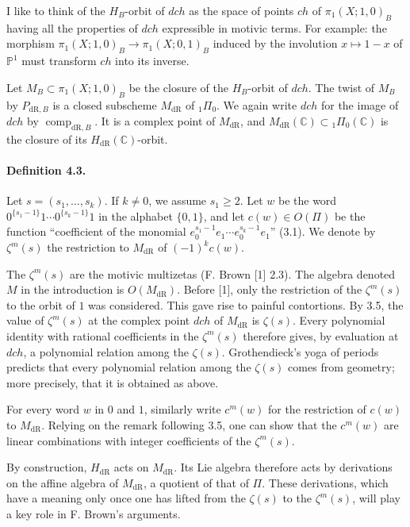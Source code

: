 \documentclass[11pt]{article}
\newcommand{\C}{\mathbb C}
\newcommand{\PP}{\mathbb P}
\newcommand{\comp}{\operatorname{comp}}
\newcommand{\dR}{\mathrm{dR}}
\begin{document}
I like to think of the $H_B$-orbit of $dch$ as the space of points $ch$ of $\pi_1(X;1,0)_B$ having all the properties of $dch$ expressible in motivic terms.
For example: the morphism $\pi_1(X;1,0)_B\to\pi_1(X;0,1)_B$ induced by the involution $x\mapsto1-x$ of $\PP^1$ must transform $ch$ into its inverse.

Let $M_B\subset\pi_1(X;1,0)_B$ be the closure of the $H_B$-orbit of $dch$.
The twist of $M_B$ by $P_{\dR,B}$ is a closed subscheme $M_{\dR}$ of ${}_1\Pi_0$.
We again write $dch$ for the image of $dch$ by $\comp_{\dR,B}$.
It is a complex point of $M_{\dR}$, and $M_{\dR}(\C)\subset{}_1\Pi_0(\C)$ is the closure of its $H_{\dR}(\C)$-orbit.

\paragraph{Definition 4.3.}
Let $s=(s_1,\ldots,s_k)$.
If $k\ne0$, we assume $s_1\geq2$.
Let $w$ be the word $0^{\{s_1-1\}}1\cdots 0^{\{s_k-1\}}1$ in the alphabet $\{0,1\}$, and let $c(w)\in O(\Pi)$ be the function ``coefficient of the monomial $e_0^{s_1-1}e_1\cdots e_0^{s_k-1}e_1$'' (3.1).
We denote by $\zeta^m(s)$ the restriction to $M_{\dR}$ of $(-1)^k c(w)$.

The $\zeta^m(s)$ are the motivic multizetas (F. Brown [1] 2.3).
The algebra denoted $M$ in the introduction is $O(M_{\dR})$.
Before [1], only the restriction of the $\zeta^m(s)$ to the orbit of $1$ was considered.
This gave rise to painful contortions.
By 3.5, the value of $\zeta^m(s)$ at the complex point $dch$ of $M_{\dR}$ is $\zeta(s)$.
Every polynomial identity with rational coefficients in the $\zeta^m(s)$ therefore gives, by evaluation at $dch$, a polynomial relation among the $\zeta(s)$.
Grothendieck's yoga of periods predicts that every polynomial relation among the $\zeta(s)$ comes from geometry; more precisely, that it is obtained as above.

For every word $w$ in $0$ and $1$, similarly write $c^m(w)$ for the restriction of $c(w)$ to $M_{\dR}$.
Relying on the remark following 3.5, one can show that the $c^m(w)$ are linear combinations with integer coefficients of the $\zeta^m(s)$.

By construction, $H_{\dR}$ acts on $M_{\dR}$.
Its Lie algebra therefore acts by derivations on the affine algebra of $M_{\dR}$, a quotient of that of $\Pi$.
These derivations, which have a meaning only once one has lifted from the $\zeta(s)$ to the $\zeta^m(s)$, will play a key role in F. Brown's arguments.
\end{document}
